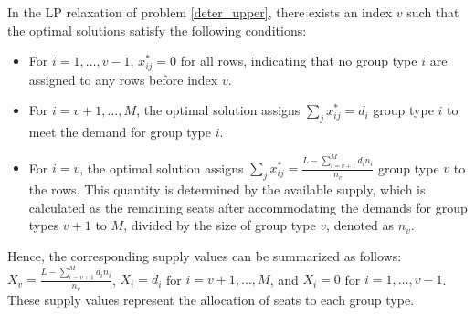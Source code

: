 \begin{prop}\label{sol_relax_deter}
In the LP relaxation of problem \eqref{deter_upper}, there exists an index $v$ such that the optimal solutions satisfy the following conditions:

\begin{itemize}
  \item For $i = 1,\ldots, v-1$, $x_{ij}^{*} = 0$ for all rows, indicating that no group type $i$ are assigned to any rows before index $v$.
  \item For $i = v+1,\ldots, M$, the optimal solution assigns $\sum_{j} x_{ij}^{*} = d_{i}$ group type $i$ to meet the demand for group type $i$.
  \item For $i = v$, the optimal solution assigns $\sum_{j} x_{ij}^{*} = \frac{L - \sum_{i = v+1}^{M} {d_i n_i}}{n_v}$ group type $v$ to the rows. This quantity is determined by the available supply, which is calculated as the remaining seats after accommodating the demands for group types $v+1$ to $M$, divided by the size of group type $v$, denoted as $n_v$.
\end{itemize}

Hence, the corresponding supply values can be summarized as follows: $X_v = \frac{L - \sum_{i = v+1}^{M} {d_i n_i}}{n_v}$, $X_{i} = d_{i}$ for $i = v+1,\ldots, M$, and $X_{i} = 0$ for $i = 1, \ldots, v-1$. These supply values represent the allocation of seats to each group type.
\end{prop}




